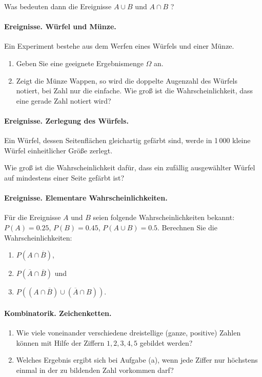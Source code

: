Was bedeuten dann die Ereignisse $A\cup B$ und $A\cap B$ ?


\paragraph{Ereignisse. Würfel und Münze.}
Ein Experiment bestehe aus dem Werfen eines Würfels und einer Münze.
\begin{enumerate}
    \item Geben Sie eine geeignete Ergebnismenge $\Omega$ an.
    \item Zeigt die Münze Wappen, so wird die doppelte Augenzahl des Würfels
        notiert, bei Zahl nur die einfache. Wie groß ist die
        Wahrscheinlichkeit, dass eine gerade Zahl notiert wird?
\end{enumerate}


\paragraph{Ereignisse. Zerlegung des Würfels.}
Ein Würfel, dessen Seitenflächen gleichartig gefärbt sind, werde in 1\,000
kleine Würfel einheitlicher Größe zerlegt.

Wie groß ist die Wahrscheinlichkeit dafür, dass ein zufällig ausgewählter
Würfel auf mindestens einer Seite gefärbt ist?


\paragraph{Ereignisse. Elementare Wahrscheinlichkeiten.}
Für die Ereignisse $A$ und $B$ seien folgende Wahrscheinlichkeiten bekannt:
$P(A)=0.25$, $P(B)=0.45$, $P(A\cup B)=0.5$. Berechnen Sie die
Wahrscheinlichkeiten:
\begin{enumerate}
    \item $P(A\cap\overline{B})$,
    \item $P(\overline{A}\cap\overline{B})$ und
    \item $P\left((A\cap\overline{B})\cup(\overline{A}\cap B)\right)$.
\end{enumerate}





\paragraph{Kombinatorik. Zeichenketten.}
\begin{enumerate}
\item Wie viele voneinander verschiedene dreistellige (ganze, positive)
Zahlen können mit Hilfe der Ziffern $1,2,3,4,5$ gebildet werden?
\item Welches Ergebnis ergibt sich bei Aufgabe (a), wenn jede Ziffer nur
höchstens einmal in der zu bildenden Zahl vorkommen darf?
\end{enumerate}



